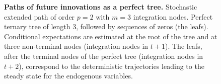 \documentclass[a4paper,12pt]{amsart}
\begin{document}
\begin{figure}[H]
   \label{sep:tree}
   \centering
   {\tiny
      }
   \bigskip\bigskip
   \caption{\textbf{Paths of  future innovations as a perfect tree.} Stochastic extended path of order $p=2$ with $m=3$ integration nodes. Perfect ternary tree of length 3, followed by sequences of zeros (the leafs). Conditional expectations are estimated at the root of the tree and at three non-terminal nodes (integration nodes in $t+1$). The leafs, after the terminal nodes of the perfect tree (integration nodes in $t+2$), correspond to the deterministic trajectories leading to the steady state for the endogenous variables.}
 \end{figure}
\end{document}
